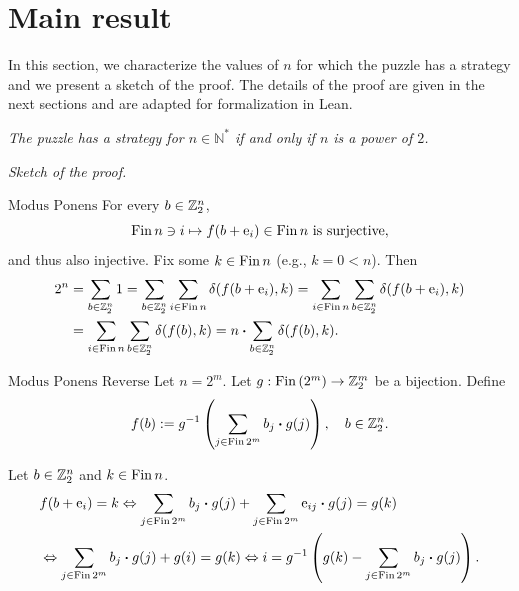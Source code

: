\section{Main result}


In this section, we characterize the values of $n$ for which the puzzle has a strategy and we present a sketch of the proof. The details of the proof are given in the next sections and are adapted for formalization in Lean.

\smallskip

{\it The puzzle has a strategy for $n\in\mathbb{N}^*$ if and only if $n$ is a power of $2$.}

\medskip

{\it Sketch of the proof.}

$\boxed{\text{Modus Ponens}}$ For every $b\in\mathbb{Z}_2^n$,
$$\mathrm{Fin}\, n\ni i\mapsto f(b+{\rm e}_i)\in \mathrm{Fin}\, n \text{ is surjective},$$ and thus also injective.
Fix some $k \in \mathrm{Fin}\, n$ (e.g., $k=0 < n$).
Then
\begin{align*}
2^n & = \sum_{b\in\mathbb{Z}_2^n} 1  = \sum_{b\in\mathbb{Z}_2^n} \sum_{i\in\mathrm{Fin}\, n}
\delta(f(b+{\rm e}_i),k) = \sum_{i\in\mathrm{Fin}\, n} \sum_{b\in\mathbb{Z}_2^n} \delta(f(b+{\rm e}_i),k)\\
& = \sum_{i\in\mathrm{Fin}\, n} \sum_{b\in\mathbb{Z}_2^n} \delta(f(b),k)  = n \boldsymbol{\cdot} \sum_{b\in\mathbb{Z}_2^n} \delta(f(b),k).
\end{align*}


$\boxed{\text{Modus Ponens Reverse}}$  Let $n=2^m$. Let $g : \mathrm{Fin}\, (2^m) \to \mathbb{Z}_2^m$ be a bijection. Define
$$f(b) := g^{-1}\left(\sum_{j\in\mathrm{Fin}\, 2^m} b_j \boldsymbol{\cdot} g(j)\right), \quad b\in\mathbb{Z}_2^n.$$

Let $b\in\mathbb{Z}_2^n$ and $k\in\mathrm{Fin}\, n$.
\begin{align*}
& f(b+{\rm e}_i) = k
 \Leftrightarrow \sum_{j\in\mathrm{Fin}\, 2^m} b_j \boldsymbol{\cdot} g(j) +
                  \sum_{j\in\mathrm{Fin}\, 2^m} {\rm e}_{ij} \boldsymbol{\cdot} g(j) = g(k) \\
& \Leftrightarrow \sum_{j\in\mathrm{Fin}\, 2^m} b_j \boldsymbol{\cdot} g(j) + g(i) = g(k)  \Leftrightarrow i = g^{-1}\left(g(k) - \sum_{j\in\mathrm{Fin}\, 2^m} b_j \boldsymbol{\cdot} g(j)\right).
\end{align*}

